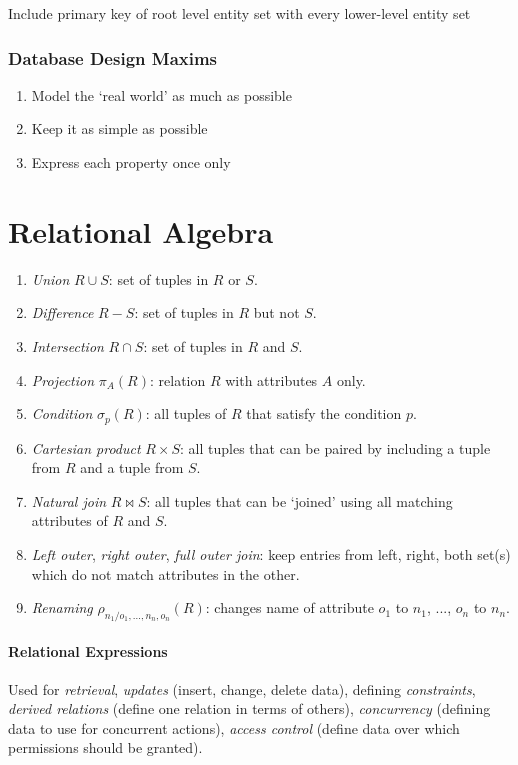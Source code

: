 \documentclass[twocolumn,english]{article}
\begin{document}
Include primary key of root level entity set with every lower-level
entity set


\subsubsection{Database Design Maxims}
\begin{enumerate}
\item Model the `real world' as much as possible
\item Keep it as simple as possible
\item Express each property once only
\end{enumerate}

\section{Relational Algebra}
\begin{enumerate}
\item \emph{Union} $R\cup S$: set of tuples in $R$ or $S$.
\item \emph{Difference} $R-S$: set of tuples in $R$ but not $S$.
\item \emph{Intersection} $R\cap S$: set of tuples in $R$ and $S$.
\item \emph{Projection} $\pi_{A}(R)$: relation $R$ with attributes $A$
only.
\item \emph{Condition} $\sigma_{p}(R)$: all tuples of $R$ that satisfy
the condition $p$.
\item \emph{Cartesian product} $R\times S$: all tuples that can be paired
by including a tuple from $R$ and a tuple from $S$.
\item \emph{Natural join} $R\bowtie S$: all tuples that can be `joined'
using all matching attributes of $R$ and $S$.
\item \emph{Left outer}, \emph{right outer}, \emph{full outer join}: keep
entries from left, right, both set(s) which do not match attributes
in the other.
\item \emph{Renaming} $\rho_{n_{1}/o_{1},\dots,n_{n},o_{n}}(R)$: changes
name of attribute $o_{1}$ to $n_{1}$, ..., $o_{n}$ to $n_{n}$.
\end{enumerate}

\paragraph{Relational Expressions}

Used for \emph{retrieval}, \emph{updates} (insert, change, delete
data), defining \emph{constraints}, \emph{derived relations} (define
one relation in terms of others), \emph{concurrency} (defining data
to use for concurrent actions), \emph{access control} (define data
over which permissions should be granted).
\end{document}
